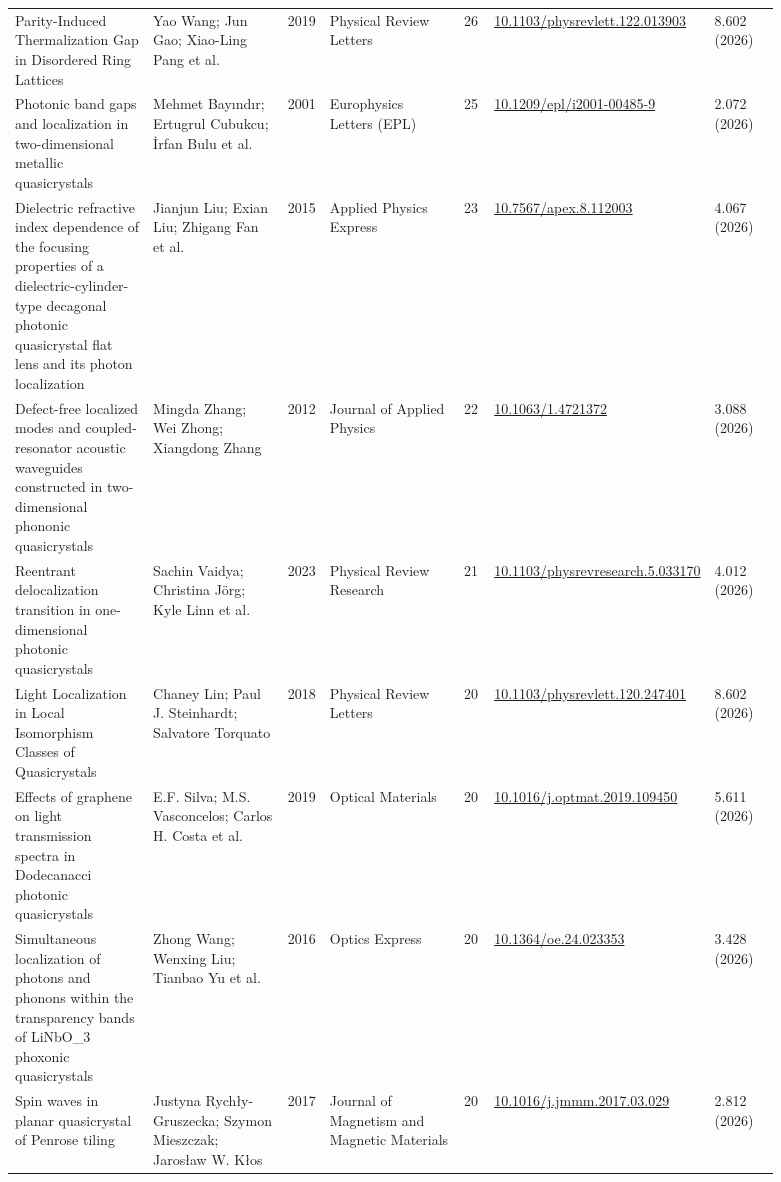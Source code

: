 \documentclass[10pt,a4paper]{article}
\begin{document}
{\begin{longtable}{p{0.192\linewidth}p{0.192\linewidth}p{0.043\linewidth}p{0.192\linewidth}p{0.043\linewidth}p{0.132\linewidth}p{0.096\linewidth}}
Parity-Induced Thermalization Gap in Disordered Ring Lattices & Yao Wang; Jun Gao; Xiao-Ling Pang et al. & 2019 & Physical Review Letters & 26 & \href{https://doi.org/10.1103/physrevlett.122.013903}{10.1103/physrevlett.122.013903} & 8.602 (2026) \\
Photonic band gaps and localization in two-dimensional metallic quasicrystals & Mehmet Bayındır; Ertugrul Cubukcu; İrfan Bulu et al. & 2001 & Europhysics Letters (EPL) & 25 & \href{https://doi.org/10.1209/epl/i2001-00485-9}{10.1209/epl/i2001-00485-9} & 2.072 (2026) \\
Dielectric refractive index dependence of the focusing properties of a dielectric-cylinder-type decagonal photonic quasicrystal flat lens and its photon localization & Jianjun Liu; Exian Liu; Zhigang Fan et al. & 2015 & Applied Physics Express & 23 & \href{https://doi.org/10.7567/apex.8.112003}{10.7567/apex.8.112003} & 4.067 (2026) \\
Defect-free localized modes and coupled-resonator acoustic waveguides constructed in two-dimensional phononic quasicrystals & Mingda Zhang; Wei Zhong; Xiangdong Zhang & 2012 & Journal of Applied Physics & 22 & \href{https://doi.org/10.1063/1.4721372}{10.1063/1.4721372} & 3.088 (2026) \\
Reentrant delocalization transition in one-dimensional photonic quasicrystals & Sachin Vaidya; Christina Jörg; Kyle Linn et al. & 2023 & Physical Review Research & 21 & \href{https://doi.org/10.1103/physrevresearch.5.033170}{10.1103/physrevresearch.5.033170} & 4.012 (2026) \\
Light Localization in Local Isomorphism Classes of Quasicrystals & Chaney Lin; Paul J. Steinhardt; Salvatore Torquato & 2018 & Physical Review Letters & 20 & \href{https://doi.org/10.1103/physrevlett.120.247401}{10.1103/physrevlett.120.247401} & 8.602 (2026) \\
Effects of graphene on light transmission spectra in Dodecanacci photonic quasicrystals & E.F. Silva; M.S. Vasconcelos; Carlos H. Costa et al. & 2019 & Optical Materials & 20 & \href{https://doi.org/10.1016/j.optmat.2019.109450}{10.1016/j.optmat.2019.109450} & 5.611 (2026) \\
Simultaneous localization of photons and phonons within the transparency bands of LiNbO\_3 phoxonic quasicrystals & Zhong Wang; Wenxing Liu; Tianbao Yu et al. & 2016 & Optics Express & 20 & \href{https://doi.org/10.1364/oe.24.023353}{10.1364/oe.24.023353} & 3.428 (2026) \\
Spin waves in planar quasicrystal of Penrose tiling & Justyna Rychły-Gruszecka; Szymon Mieszczak; Jarosław W. Kłos & 2017 & Journal of Magnetism and Magnetic Materials & 20 & \href{https://doi.org/10.1016/j.jmmm.2017.03.029}{10.1016/j.jmmm.2017.03.029} & 2.812 (2026) \\

\end{longtable}}
\end{document}
